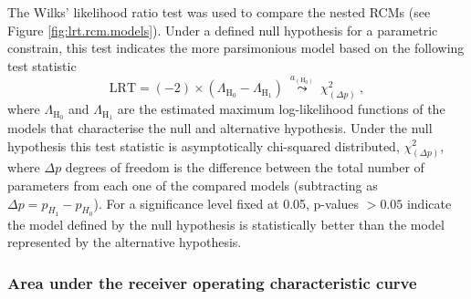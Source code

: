 The Wilks' likelihood ratio test was used to compare the nested RCMs (see Figure \ref{fig:lrt.rcm.models}).
Under a defined null hypothesis for a parametric constrain, this test indicates the more parsimonious model based on the following test statistic
%
\begin{equation}
    \label{eq:lrt}
    \text{LRT} = (-2)\times\left(\Lambda_{\text{H}_0} - \Lambda_{\text{H}_1}\right)\   \overset{a_{\left(\text{H}_0\right)}}{\leadsto}\    \chi_{(\Delta p)}^{2}\ ,
\end{equation}
%
\noindent
where $\Lambda_{\text{H}_0}$ and $\Lambda_{\text{H}_1}$ are the estimated maximum log-likelihood functions of the models that characterise the null and alternative hypothesis.
Under the null hypothesis this test statistic is asymptotically chi-squared distributed, $\chi_{(\Delta p)}^{2}$, where $\Delta p$ degrees of freedom is the difference between the total number of parameters from each one of the compared models (subtracting as $\Delta p = p_{H_{1}}-p_{H_{0}}$).
For a significance level fixed at 0.05, p-values $>0.05$ indicate the model defined by the null hypothesis is statistically better than the model represented by the alternative hypothesis.



\subsubsection{Area under the receiver operating characteristic curve}

